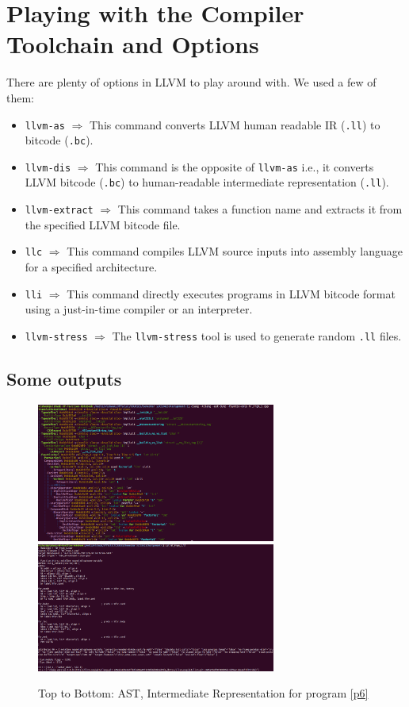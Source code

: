 \documentclass{article}
\begin{document}
\section{Playing with the Compiler Toolchain and Options}
\begin{flushleft}
There are plenty of options in LLVM to play around with. We used a few of them:
\begin{itemize}
\item \texttt{llvm-as} \(\Rightarrow\) This command converts LLVM human readable IR (\texttt{.ll}) to bitcode (\texttt{.bc}). 
\item \texttt{llvm-dis} \(\Rightarrow\) This command is the opposite of \texttt{llvm-as} i.e., 	it converts LLVM bitcode (\texttt{.bc}) to human-readable intermediate representation (\texttt{.ll}).
\item \texttt{llvm-extract} \(\Rightarrow\) This command takes a function name and extracts it from the specified LLVM bitcode file.
\item \texttt{llc} \(\Rightarrow\) This command compiles LLVM source inputs into assembly language for a specified architecture.
\item \texttt{lli} \(\Rightarrow\) This command directly executes programs in LLVM bitcode format using a just-in-time compiler or an interpreter.
\item \texttt{llvm-stress} \(\Rightarrow\) The \texttt{llvm-stress} tool is used to generate random \texttt{.ll} files.
\end{itemize}
\end{flushleft}

\subsection{Some outputs}
\begin{figure}[H]
\centering
\includegraphics[width=0.7\textwidth]{./images/NT_1_AST.png}
\includegraphics[width=0.7\textwidth]{./images/NT_1_IR.png}
\caption{Top to Bottom: AST, Intermediate Representation for program \ref{p6}}
\end{figure}
\end{document}
